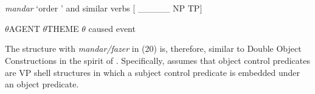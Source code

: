 \documentclass[output=paper]{langsci/langscibook}
\begin{document}
\ea%
    \label{ex:moreno:20}
    \gll\\
        \\
    \glt
    \z

          \textit{mandar} ‘order ’ and similar verbs [     \_\_\_\_\_         NP                  TP]

                      $\theta $AGENT  $\theta $THEME   $\theta $ caused event

 

The structure with \textit{mandar/fazer} in (20) is, therefore, similar to Double Object Constructions in the spirit of \citet{Larson1988}. Specifically, \citet{Larson1988} assumes that object control predicates are VP shell structures in which a subject control predicate is embedded under an object predicate.
\end{document}
